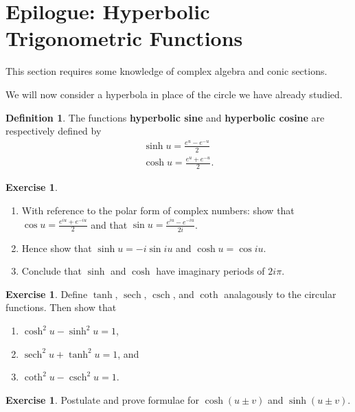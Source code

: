 \documentclass[a4paper,leqno]{article}
\numberwithin{equation}{section}
\theoremstyle{definition}
\newtheorem{defn}[equation]{Definition}
\newtheorem{exercise}[equation]{Exercise}
\theoremstyle{remark}
\newcommand{\df}[1]{\textbf{#1}}
\DeclareMathOperator{\sech}{sech}
\DeclareMathOperator{\csch}{csch}
\begin{document}
\section{Epilogue: Hyperbolic Trigonometric Functions}
\begin{center}
  This section requires some knowledge of complex algebra and conic sections.
\end{center}
We will now consider a hyperbola in place of the circle we have already studied.
\begin{defn}
  The functions \df{hyperbolic sine} and \df{hyperbolic cosine} are respectively defined by
  \begin{gather*}
    \sinh u = \frac{e^u - e^{-u}}{2}\\
    \cosh u = \frac{e^u + e^{-u}}{2}.
  \end{gather*}
\end{defn}

\begin{exercise}\leavevmode
  \begin{enumerate}
    \item With reference to the polar form of complex numbers: show that $ \cos u = \frac{e^{iu} + e^{-iu}}{2} $ and
          that $ \sin u = \frac{e^{iu} - e^{-iu}}{2i} $.
    \item Hence show that $ \sinh u = -i \sin iu $ and $ \cosh u = \cos iu $.
    \item Conclude that $ \sinh $ and $ \cosh $ have imaginary periods of $ 2i\pi $.
  \end{enumerate}
\end{exercise}

\begin{exercise}\label{ex:hyperidentities}
  Define $ \tanh $, $ \sech $, $ \csch $, and $ \coth $ analagously to the circular functions. Then show that
  \begin{enumerate}
    \item $ \cosh^2 u - \sinh^2 u = 1 $,
    \item $ \sech^2 u + \tanh^2 u = 1 $, and
    \item $ \coth^2 u - \csch^2 u = 1 $.
  \end{enumerate}
\end{exercise}

\begin{exercise}
  Postulate and prove formulae for $ \cosh(u \pm v) $ and $ \sinh(u \pm v) $.
\end{exercise}
\end{document}
